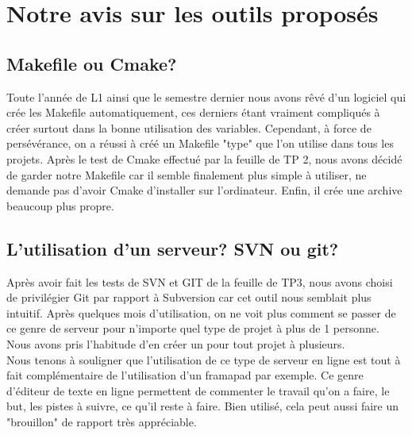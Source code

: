 \documentclass{report}
\begin{document}
\chapter{Notre avis sur les outils proposés}

\section{Makefile ou Cmake?}
Toute l'année de L1 ainsi que le semestre dernier nous avons rêvé d'un logiciel qui crée les Makefile automatiquement, ces derniers étant vraiment compliqués à créer surtout dans la bonne utilisation des variables. Cependant, à force de persévérance, on a réussi à créé un Makefile "type" que l'on utilise dans tous les projets. Après le test de Cmake effectué par la feuille de TP 2, nous avons décidé de garder notre Makefile car il semble finalement plus simple à utiliser, ne demande pas d'avoir Cmake d'installer sur l'ordinateur. Enfin, il crée une archive beaucoup plus propre.

\section{L'utilisation d'un serveur? SVN ou git?}
Après avoir fait les tests de SVN et GIT de la feuille de TP3, nous avons choisi de privilégier Git par rapport à Subversion car cet outil nous  semblait plus intuitif. Après quelques mois d'utilisation, on ne voit plus comment se passer de ce genre de serveur pour n'importe quel type de projet à plus de 1 personne. Nous avons pris l'habitude d'en créer un pour tout projet à plusieurs.\\
Nous tenons à souligner que l'utilisation de ce type de serveur en ligne est tout à fait complémentaire de l'utilisation d'un framapad par exemple. Ce genre d'éditeur de texte en ligne permettent de commenter le travail qu'on a faire, le but, les pistes à suivre, ce qu'il reste à faire. Bien utilisé, cela peut aussi faire un "brouillon" de rapport très appréciable.
\end{document}
